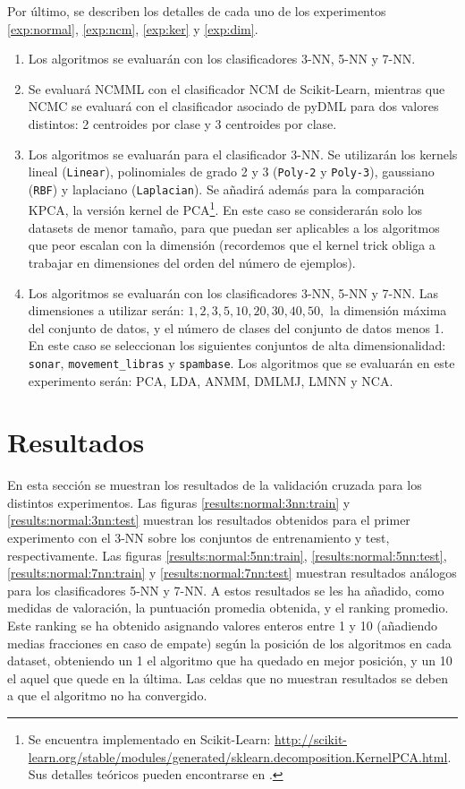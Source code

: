 Por último, se describen los detalles de cada uno de los experimentos \ref{exp:normal}, \ref{exp:ncm}, \ref{exp:ker} y \ref{exp:dim}.
\begin{enumerate}
    \item Los algoritmos se evaluarán con los clasificadores 3-NN, 5-NN y 7-NN.
    \item Se evaluará NCMML con el clasificador NCM de Scikit-Learn, mientras que NCMC se evaluará con el clasificador asociado de pyDML para dos valores distintos: 2 centroides por clase y 3 centroides por clase.
    \item Los algoritmos se evaluarán para el clasificador 3-NN. Se utilizarán los kernels lineal (\texttt{Linear}), polinomiales de grado 2 y 3 (\texttt{Poly-2} y \texttt{Poly-3}), gaussiano (\texttt{RBF}) y laplaciano (\texttt{Laplacian}). Se añadirá además para la comparación KPCA, la versión kernel de PCA\footnote{Se encuentra implementado en Scikit-Learn: \url{http://scikit-learn.org/stable/modules/generated/sklearn.decomposition.KernelPCA.html}. Sus detalles teóricos pueden encontrarse en \cite{kpca}.}. En este caso se considerarán solo los datasets de menor tamaño, para que puedan ser aplicables a los algoritmos que peor escalan con la dimensión (recordemos que el kernel trick obliga a trabajar en dimensiones del orden del número de ejemplos).
    \item Los algoritmos se evaluarán con los clasificadores 3-NN, 5-NN y 7-NN. Las dimensiones a utilizar serán: $1, 2, 3, 5, 10, 20, 30, 40, 50, $ la dimensión máxima del conjunto de datos, y el número de clases del conjunto de datos menos 1. En este caso se seleccionan los siguientes conjuntos de alta dimensionalidad: \texttt{sonar}, \texttt{movement\_libras} y \texttt{spambase}. Los algoritmos que se evaluarán en este experimento serán: PCA, LDA, ANMM, DMLMJ, LMNN y NCA.
\end{enumerate}

\section{Resultados}

En esta sección se muestran los resultados de la validación cruzada para los distintos experimentos. Las figuras \ref{results:normal:3nn:train} y \ref{results:normal:3nn:test} muestran los resultados obtenidos para el primer experimento con el 3-NN sobre los conjuntos de entrenamiento y test, respectivamente. Las figuras \ref{results:normal:5nn:train}, \ref{results:normal:5nn:test}, \ref{results:normal:7nn:train} y \ref{results:normal:7nn:test} muestran resultados análogos para los clasificadores 5-NN y 7-NN. A estos resultados se les ha añadido, como medidas de valoración, la puntuación promedia obtenida, y el ranking promedio. Este ranking se ha obtenido asignando valores enteros entre 1 y 10 (añadiendo medias fracciones en caso de empate) según la posición de los algoritmos en cada dataset, obteniendo un 1 el algoritmo que ha quedado en mejor posición, y un 10 el aquel que quede en la última. Las celdas que no muestran resultados se deben a que el algoritmo no ha convergido.

